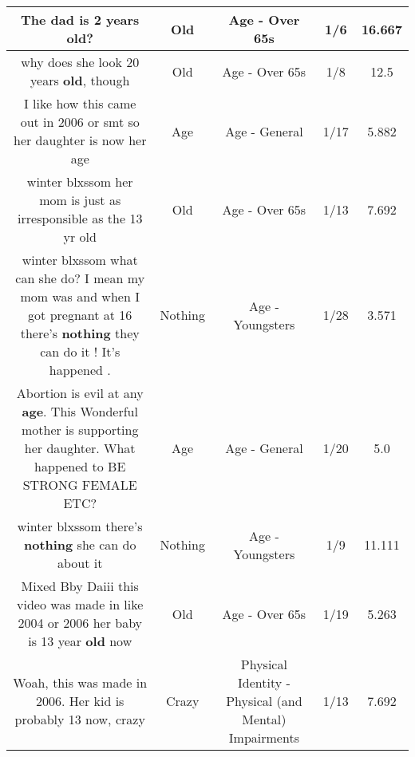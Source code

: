 \documentclass[11pt]{article}
\newlength\mylength
\begin{document}
\begin{center}
\begin{longtable}{|C{.65\mylength}|C{.30\mylength}|C{.12\mylength}|C{.12\mylength}|C{.12\mylength}|}
  \small The dad is 2 years \textbf{old}?\normalsize   & Old & Age - Over 65s & 1/6 & 16.667 \\  \hline
  \small why does she look 20 years \textbf{old}, though\normalsize   & Old & Age - Over 65s & 1/8 & 12.5 \\  \hline
  \small I like how this came out in 2006 or smt so her daughter is now her age\normalsize   & Age & Age - General & 1/17 & 5.882 \\  \hline
  \small winter blxssom her mom is just as irresponsible as the 13 yr old\normalsize   & Old & Age - Over 65s & 1/13 & 7.692 \\  \hline
  \small winter blxssom what can she do? I mean my mom was and when I got pregnant at 16 there's \textbf{nothing} they can do it ! It's happened .\normalsize   & Nothing & Age - Youngsters & 1/28 & 3.571 \\  \hline
  \small Abortion is evil at any \textbf{age}. This Wonderful mother is supporting her daughter. What happened to BE STRONG FEMALE ETC?\normalsize   & Age & Age - General & 1/20 & 5.0 \\  \hline
  \small winter blxssom there's \textbf{nothing} she can do about it\normalsize   & Nothing & Age - Youngsters & 1/9 & 11.111 \\  \hline
  \small Mixed Bby Daiii this video was made in like 2004 or 2006 her baby is 13 year \textbf{old} now\normalsize   & Old & Age - Over 65s & 1/19 & 5.263 \\  \hline
  \small Woah, this was made in 2006. Her kid is probably 13 now, crazy\normalsize   & Crazy & Physical Identity - Physical (and Mental) Impairments & 1/13 & 7.692 \\  \hline

\end{longtable}
\end{center}
\end{document}
